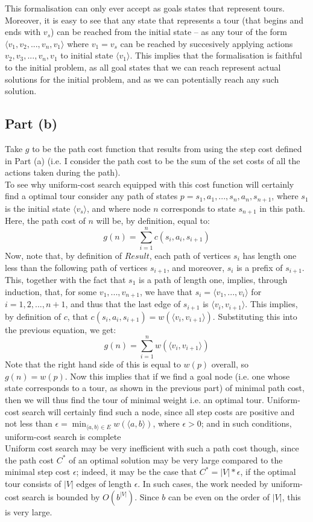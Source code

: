 \documentclass[a4paper,12pt]{scrartcl}
\begin{document}
This formalisation can only ever accept as goals states that represent tours. Moreover, it is easy to see that any state that represents a tour (that begins and ends with $v_s$) can be reached from the initial state -- as any tour of the form $\langle v_1, v_2, ..., v_n, v_1 \rangle$ where $v_1 = v_s$ can be reached by succesively applying actions $v_2, v_3, ..., v_n, v_1$ to initial state $\langle v_1 \rangle$. This implies that the formalisation is faithful to the initial problem, as all goal states that we can reach represent actual solutions for the initial problem, and as we can potentially reach any such solution.

\subsection*{Part (b)}
Take $g$ to be the path cost function that results from using the step cost defined in Part (a) (i.e. I consider the path cost to be the sum of the set costs of all the actions taken during the path). \\
To see why uniform-cost search equipped with this cost function will certainly find a optimal tour consider any path of states $p = s_1, a_1, ..., s_n, a_n, s_{n+1}$, where $s_1$ is the initial state $\langle v_s \rangle$, and where node $n$ corresponds to state $s_{n+1}$ in this path. Here, the path cost of $n$ will be, by definition, equal to:
\[
    g(n) = \sum_{i=1}^n c(s_i, a_i, s_{i+1})
\]
Now, note that, by definition of $Result$, each path of vertices $s_i$ has length one less than the following path of vertices $s_{i+1}$, and moreover, $s_i$ is a prefix of $s_{i+1}$. This, together with the fact that $s_1$ is a path of length one, implies, through induction, that, for some $v_1, ..., v_{n+1}$, we have that $s_i = \langle v_1, ..., v_i \rangle$ for $i = 1, 2, ..., n+1$, and thus that the last edge of $s_{i+1}$ is $\langle v_i, v_{i+1} \rangle$. This implies, by definition of $c$, that $c(s_i, a_i, s_{i+1}) = w(\langle v_i, v_{i+1} \rangle)$. Substituting this into the previous equation, we get:
\[
    g(n) = \sum_{i=1}^n w(\langle v_i, v_{i+1} \rangle)
\]
Note that the right hand side of this is equal to $w(p)$ overall, so $g(n) = w(p)$. Now this implies that if we find a goal node (i.e. one whose state corresponds to a tour, as shown in the previous part) of minimal path cost, then we will thus find the tour of minimal weight i.e. an optimal tour. Uniform-cost search will certainly find such a node, since all step costs are positive and not less than $\epsilon = \min_{\langle a, b \rangle \in E} w(\langle a, b \rangle)$, where $\epsilon > 0$; and in such conditions, uniform-cost search is complete\\
Uniform cost search may be very inefficient with such a path cost though, since the path cost $C^*$ of an optimal solution may be very large compared to the minimal step cost $\epsilon$; indeed, it may be the case that $C^* = |V| * \epsilon$, if the optimal tour consists of $|V|$ edges of length $\epsilon$. In such cases, the work needed by uniform-cost search is bounded by $O(b^{|V|})$. Since $b$ can be even on the order of $|V|$, this is very large.
\end{document}
